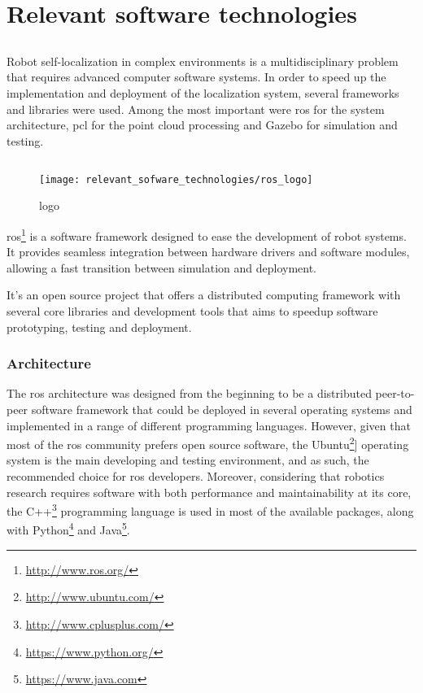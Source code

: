 \chapter{Relevant software technologies} \label{chap:relevant-sofware-technologies}



\section*{}

Robot self-localization in complex environments is a multidisciplinary problem that requires advanced computer software systems. In order to speed up the implementation and deployment of the localization system, several frameworks and libraries were used. Among the most important were \gls{ros} for the system architecture, \gls{pcl} for the point cloud processing and Gazebo for simulation and testing.



\section{}

\begin{wrapfigure}{r}{0.25\textwidth}
	\centering
	\texttt{[image: relevant\_sofware\_technologies/ros\_logo]}
	\caption{ logo}
	\label{fig:relevant-sofware-technologies_ros-logo}
\end{wrapfigure}

\gls{ros}\footnote{\url{http://www.ros.org/}} \cite{Quigley2009} is a software framework designed to ease the development of robot systems. It provides seamless integration between hardware drivers and software modules, allowing a fast transition between simulation and deployment.

It's an open source project that offers a distributed computing framework with several core libraries and development tools that aims to speedup software prototyping, testing and deployment.


\subsection{Architecture}

The \gls{ros} architecture was designed from the beginning to be a distributed peer-to-peer software framework that could be deployed in several operating systems and implemented in a range of different programming languages. However, given that most of the \gls{ros} community prefers open source software, the Ubuntu\footnote{\url{http://www.ubuntu.com/}}] operating system is the main developing and testing environment, and as such, the recommended choice for \gls{ros} developers. Moreover, considering that robotics research requires software with both performance and maintainability at its core, the C++\footnote{\url{http://www.cplusplus.com/}} programming language is used in most of the available packages, along with Python\footnote{\url{https://www.python.org/}} and Java\footnote{\url{https://www.java.com}}.


